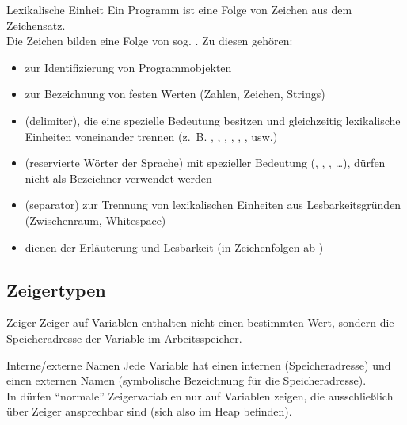 \begin{Def}{Lexikalische Einheit}
    Ein Programm ist eine Folge von Zeichen aus dem Zeichensatz. \\
    Die Zeichen bilden eine Folge von sog. .
    Zu diesen gehören:
    \begin{itemize}
        \item {} zur Identifizierung von Programmobjekten

        \item {} zur Bezeichnung von festen Werten
        (Zahlen, Zeichen, Strings)

        \item {} (delimiter), die eine spezielle Bedeutung
        besitzen und gleichzeitig lexikalische Einheiten voneinander trennen
        (z.~B. \adacode{\&}, , \adacode{+}, \adacode{(},
        \adacode{)}, \adacode{:=}, \adacode{>=} usw.)

        \item {} (reservierte Wörter der Sprache) mit
        spezieller Bedeutung (, , \linebreak
        , \dots),
        dürfen nicht als Bezeichner verwendet werden

        \item {} (separator) zur Trennung von lexikalischen
        Einheiten aus Lesbarkeitsgründen (Zwischenraum, Whitespace)

        \item {} dienen der Erläuterung und Lesbarkeit
        (in \Ada{} Zeichenfolgen ab \adacode{{-}{-}})
    \end{itemize}
\end{Def}

\addtocounter{subsection}{1}

\subsection{%
    Zeigertypen%
}

\begin{Def}{Zeiger}
    Zeiger auf Variablen enthalten nicht einen bestimmten Wert, sondern die
    Speicheradresse der Variable im Arbeitsspeicher.
\end{Def}

\begin{Def}{Interne/externe Namen}
    Jede Variable hat einen internen (Speicheradresse) und einen externen
    Namen (symbolische Bezeichnung für die Speicheradresse). \\
    In \Ada{} dürfen "`normale"' Zeigervariablen nur auf Variablen zeigen, die
    ausschließlich über Zeiger ansprechbar sind (sich also im Heap befinden).
\end{Def}

